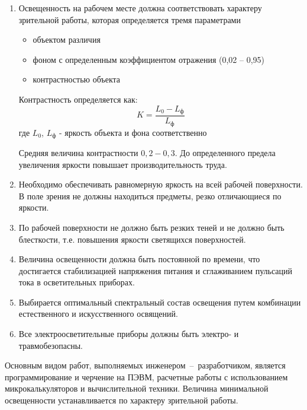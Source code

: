 \begin{enumerate}
    \item   Освещенность на рабочем месте должна соответствовать характеру
            зрительной работы, которая определяется тремя параметрами
        \begin{itemize}
            \item объектом различия
            \item фоном с определенным коэффициентом отражения (0,02 – 0,95)
            \item контрастностью объекта
        \end{itemize}
    Контрастность определяется как:
    \begin{equation}
    \label{lighting_contrast}
        K = \frac{L_0 - L_\text{ф}}{L_\text{ф}}
    \end{equation}
    где $L_0$, $L_\text{ф}$ - яркость объекта и фона соответственно

    Средняя величина контрастности $0,2 - 0,3$. До определенного предела увеличения
    яркости повышает производительность труда.

    \item   Необходимо обеспечивать равномерную яркость на всей рабочей поверхности.
            В поле зрения не должны находиться предметы, резко отличающиеся по яркости.

    \item   По рабочей поверхности не должно быть резких теней и не должно быть
            блесткости, т.е. повышения яркости светящихся поверхностей.

    \item   Величина освещенности должна быть постоянной по времени, что достигается
            стабилизацией напряжения питания и сглаживанием пульсаций тока в
            осветительных приборах.

    \item   Выбирается оптимальный спектральный состав освещения путем комбинации
            естественного и искусственного освящений.

    \item   Все электроосветительные приборы должны быть электро- и травмобезопасны.
\end{enumerate}

Основным видом работ, выполняемых инженером~--~разработчиком, является программирование
и черчение на ПЭВМ, расчетные работы с использованием микрокалькуляторов и вычислительной
техники. Величина минимальной освещенности устанавливается по характеру зрительной работы.

